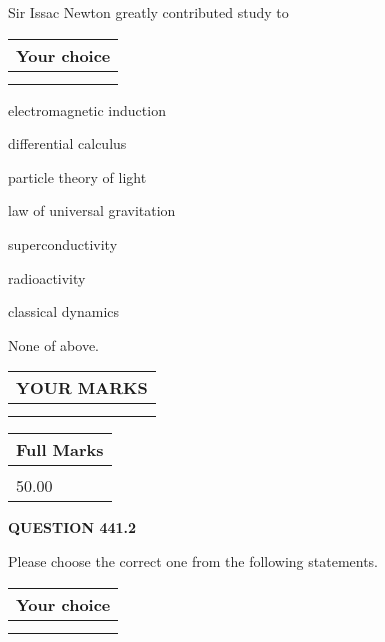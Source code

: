 \documentclass[12pt]{article}
\begin{document}
  
Sir Issac Newton greatly contributed study to
  
  
\noindent\hspace{3.0in} \begin{tabular}{|l|}
\hline
Your choice \\
\hline
 \\ 
 \\ 
\hline
\end{tabular}
  
  
 
 
electromagnetic induction
 
 
differential calculus
 
 
particle theory of light
 
 
law of universal gravitation
 
 
superconductivity
 
 
radioactivity
 
 
classical dynamics
 
 
 None of above.
 
 
  
\vspace{0.2in}
  
\noindent\begin{tabular}{|l|}
\hline
 YOUR MARKS  \\
\hline
 \\ 
 \\ 
\hline
\end{tabular}
\hspace{0.05in} \begin{tabular}{|l|}
\hline
 Full Marks  \\
\hline
 \\ 
50.00 \\
\hline
\end{tabular}
{\textbf{\Large{QUESTION
441.2 
}}}
  
  
Please choose the correct one from the following statements.
  
  
\noindent\hspace{3.0in} \begin{tabular}{|l|}
\hline
Your choice \\
\hline
 \\ 
 \\ 
\hline
\end{tabular}
  
\end{document}
